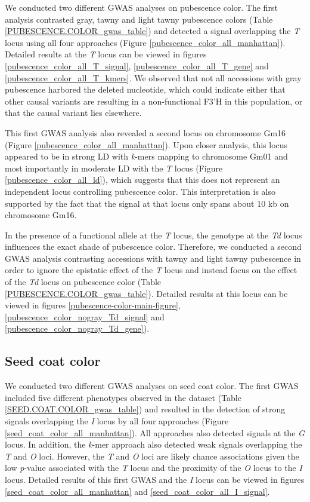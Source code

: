 We conducted two different GWAS analyses on pubescence color. The first analysis
contrasted gray, tawny and light tawny pubescence colors (Table
\ref{PUBESCENCE.COLOR_gwas_table}) and detected a signal overlapping the
\emph{T} locus using all four approaches (Figure
\ref{pubescence_color_all_manhattan}). Detailed results at the \textit{T} locus
can be viewed in figures \ref{pubescence_color_all_T_signal},
\ref{pubescence_color_all_T_gene} and \ref{pubescence_color_all_T_kmers}. We
observed that not all accessions with gray pubescence harbored the deleted
nucleotide, which could indicate either that other causal variants are resulting in
a non-functional F3’H in this population, or that the causal
variant lies elsewhere.

This first GWAS analysis also revealed a second locus on chromosome Gm16
(Figure \ref{pubescence_color_all_manhattan}). Upon closer analysis, this locus
appeared to be in strong LD with \emph{k}-mers mapping to chromosome Gm01 and
most importantly in moderate LD with the \emph{T} locus (Figure
\ref{pubescence_color_all_ld}), which suggests that this does not represent an
independent locus controlling pubescence color. This interpretation is also
supported by the fact that the signal at that locus only spans about 10 kb on
chromosome Gm16.

In the presence of a functional allele at the \emph{T} locus, the genotype at
the \emph{Td} locus influences the exact shade of pubescence color.  Therefore,
we conducted a second GWAS analysis contrasting accessions with tawny and light
tawny pubescence in order to ignore the epistatic effect of the \emph{T} locus
and instead focus on the effect of the \emph{Td} locus on pubescence color
(Table \ref{PUBESCENCE.COLOR_gwas_table}). Detailed results at this locus
can be viewed in figures \ref{pubescence-color-main-figure}, \ref{pubescence_color_nogray_Td_signal} and
\ref{pubescence_color_nogray_Td_gene}). 

\subsection*{Seed coat color}
\label{sv-gwas-seed-coat-color}

We conducted two different GWAS analyses on seed coat color. The first GWAS
included five different phenotypes observed in the dataset (Table
\ref{SEED.COAT.COLOR_gwas_table}) and resulted in the detection of strong
signals overlapping the \emph{I} locus by all four approaches (Figure
\ref{seed_coat_color_all_manhattan}). All approaches also detected
signals at the \emph{G} locus. In addition, the \emph{k}-mer approach also
detected weak signals overlapping the \emph{T} and \emph{O} loci. However, the
\emph{T} and \emph{O} loci are likely chance associations given the low \textit{p}-value
associated with the \emph{T} locus and the proximity of the \emph{O} locus to
the \emph{I} locus. Detailed results of this first GWAS and the \textit{I}
locus can be viewed in figures \ref{seed_coat_color_all_manhattan} and
\ref{seed_coat_color_all_I_signal}.

